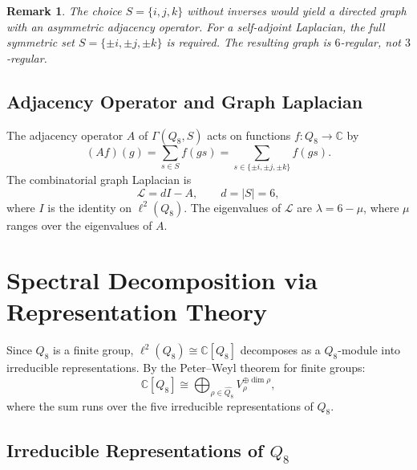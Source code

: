 \documentclass[11pt,a4paper]{article}
\newtheorem{remark}{Remark}
\begin{document}
  \begin{remark}
    The choice $S = \{i, j, k\}$ without inverses would yield a directed graph with an
    asymmetric adjacency operator.
    For a self-adjoint Laplacian, the full symmetric set
    $S = \{\pm i, \pm j, \pm k\}$ is required.
    The resulting graph is $6$-regular, not $3$-regular.
  \end{remark}

\subsection{Adjacency Operator and Graph Laplacian}
  \label{subsec:adjacency-operator-graph-laplacian}

  The adjacency operator $A$ of $\Gamma(Q_8, S)$ acts on functions
  $f \colon Q_8 \to \mathbb{C}$ by
  \begin{equation}
    (Af)(g) = \sum_{s \in S} f(gs)
  = \sum_{s \in \{\pm i, \pm j, \pm k\}} f(gs).
  \end{equation}
  The combinatorial graph Laplacian is
  \begin{equation}
    \mathcal{L} = dI - A,
    \qquad
    d = |S| = 6,
  \end{equation}
  where $I$ is the identity on $\ell^2(Q_8)$.
  The eigenvalues of $\mathcal{L}$ are $\lambda = 6 - \mu$, where $\mu$ ranges over
  the eigenvalues of $A$.
\section{Spectral Decomposition via Representation Theory}
  \label{sec:spectral-decomposition}

  Since $Q_8$ is a finite group, $\ell^2(Q_8) \cong \mathbb{C}[Q_8]$ decomposes
  as a $Q_8$-module into irreducible representations.
  By the Peter--Weyl theorem for finite groups:
  \begin{equation}
    \mathbb{C}[Q_8] \cong \bigoplus_{\rho \in \widehat{Q_8}} V_\rho^{\oplus \dim \rho},
  \end{equation}
  where the sum runs over the five irreducible representations of $Q_8$.

\subsection{Irreducible Representations of $Q_8$}
  \label{subsec:irreducible-representations-of-q_8}
\end{document}
